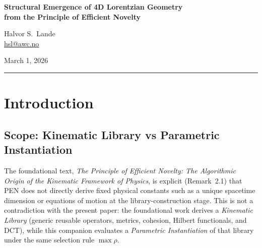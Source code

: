 \documentclass[12pt,a4paper]{article}
\theoremstyle{definition}
\begin{document}
\begin{center}
    {\LARGE\bfseries Structural Emergence of 4D Lorentzian Geometry\\[0.3em] from the Principle of Efficient Novelty}

    \vspace{1.5em}

    {\large Halvor S.~Lande}\\[0.5em]
    {\normalsize \href{mailto:hsl@awc.no}{hsl@awc.no}}

    \vspace{1em}

    {\normalsize March 1, 2026}
\end{center}

\vspace{1.5em}

\begin{abstract}
\noindent
We derive quantum kinematics, four-dimensionality, Lorentzian signature, and Einstein dynamics from the Principle of Efficient Novelty (PEN) using the spectral efficiency ratio $\rho=\nu/\kappa$ with $\nu=\nu_G+\nu_H+\nu_C$. The argument is presented in a constructive mechanization-oriented form with explicit artifact support and consistent Step~13/14/15 indexing across companion PEN materials. The resulting claim is: (i) linear/quantum kinematics is selected because Cartesian cloning collapses higher homotopical novelty ($\nu_H\to 0$); (ii) $d=4$ is selected by a native-associativity cost ceiling plus a 4D Hodge endomorphism spike in $\nu_C$; (iii) Lorentzian signature is required to prevent univalent modal collapse of Flow and Cohesion; and (iv) Einstein--Hilbert dynamics is selected as the MBTT-shortest curvature action.
\end{abstract}

\vspace{1em}
\hrule
\vspace{2em}

\section{Introduction}

\subsection{Scope: Kinematic Library vs Parametric Instantiation}

The foundational text, \emph{The Principle of Efficient Novelty: The Algorithmic Origin of the Kinematic Framework of Physics}, is explicit (Remark~2.1) that PEN does not directly derive fixed physical constants such as a unique spacetime dimension or equations of motion at the library-construction stage. This is not a contradiction with the present paper: the foundational work derives a \emph{Kinematic Library} (generic reusable operators, metrics, cohesion, Hilbert functionals, and DCT), while this companion evaluates a \emph{Parametric Instantiation} of that library under the same selection rule $\max\rho$.
\end{document}
